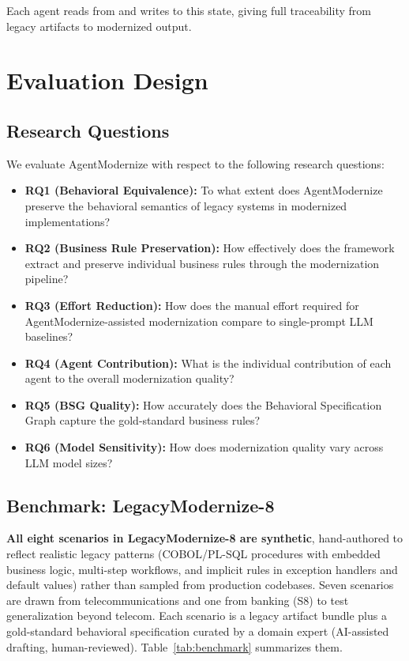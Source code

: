 \documentclass[conference]{IEEEtran}
\begin{document}
Each agent reads from and writes to this state, giving full traceability from legacy artifacts to modernized output.

\section{Evaluation Design}

\subsection{Research Questions}

We evaluate AgentModernize with respect to the following research questions:

\begin{itemize}
    \item \textbf{RQ1 (Behavioral Equivalence):} To what extent does AgentModernize preserve the behavioral semantics of legacy systems in modernized implementations?
    \item \textbf{RQ2 (Business Rule Preservation):} How effectively does the framework extract and preserve individual business rules through the modernization pipeline?
    \item \textbf{RQ3 (Effort Reduction):} How does the manual effort required for AgentModernize-assisted modernization compare to single-prompt LLM baselines?
    \item \textbf{RQ4 (Agent Contribution):} What is the individual contribution of each agent to the overall modernization quality?
    \item \textbf{RQ5 (BSG Quality):} How accurately does the Behavioral Specification Graph capture the gold-standard business rules?
    \item \textbf{RQ6 (Model Sensitivity):} How does modernization quality vary across LLM model sizes?
\end{itemize}

\subsection{Benchmark: LegacyModernize-8}
\label{sec:benchmark}

\textbf{All eight scenarios in LegacyModernize-8 are synthetic}, hand-authored to reflect realistic legacy patterns (COBOL/PL-SQL procedures with embedded business logic, multi-step workflows, and implicit rules in exception handlers and default values) rather than sampled from production codebases. Seven scenarios are drawn from telecommunications and one from banking (S8) to test generalization beyond telecom. Each scenario is a legacy artifact bundle plus a gold-standard behavioral specification curated by a domain expert (AI-assisted drafting, human-reviewed). Table~\ref{tab:benchmark} summarizes them.
\end{document}
